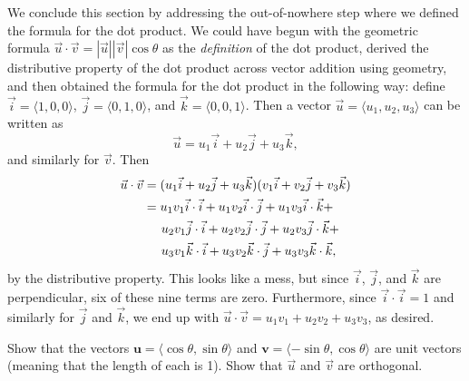 \documentclass{watsonbook}
\begin{document}
We conclude this section by addressing the out-of-nowhere step where
we defined the formula for the dot product. We could have begun with
the geometric formula
$\vec{u} \cdot \vec{v} = |\vec{u}| |\vec{v}| \cos\theta$ as the
\textit{definition} of the dot product, derived the distributive
property of the dot product across vector addition using geometry, and
then obtained the formula for the dot product in the following 
way: define $\vec{i} = \langle1,0,0\rangle$,
$\vec{j} = \langle0,1,0\rangle$, and $\vec{k} =
\langle0,0,1\rangle$. Then a vector
$\vec{u} = \langle u_1, u_2, u_3\rangle$ can be written as
\[
  \vec{u} = u_1 \vec{i} + u_2 \vec{j} + u_3 \vec{k},
\]
and similarly for $\vec{v}$. Then 
\begin{align*}
  \vec{u} \cdot \vec{v} &= (u_1 \vec{i} + u_2 \vec{j} + u_3
                          \vec{k})(v_1 \vec{i} + v_2 \vec{j} + v_3 \vec{k})  \\
                        &= u_1 v_1 \vec{i} \cdot \vec{i} + u_1 v_2 \vec{i} \cdot
                          \vec{j}  + u_1 v_3 \vec{i} \cdot \vec{k}  + \\ 
                        &\hspace{5mm}  u_2 v_1 \vec{j} \cdot \vec{i} + u_2 v_2 \vec{j} \cdot
                          \vec{j}  + u_2 v_3 \vec{j} \cdot \vec{k}  + \\ 
                        &\hspace{5mm}  u_3 v_1 \vec{k} \cdot \vec{i} + u_3 v_2 \vec{k} \cdot
                          \vec{j}  + u_3 v_3 \vec{k} \cdot \vec{k},
\end{align*}
by the distributive property. This looks like a mess, but since
$\vec{i}$,  $\vec{j}$, and  $\vec{k}$ are 
perpendicular, six of these nine terms are zero. Furthermore, since
$\vec{i}\cdot \vec{i} = 1$ and similarly for $\vec{j}$ and
$\vec{k}$, we end up with $  \vec{u} \cdot \vec{v}  = u_1 v_1
+ u_2 v_2 + u_3 v_3$, as desired.

\begin{exercise}{}{}
  Show that the vectors
  $\mathbf{u} = \langle \cos \theta, \sin \theta \rangle$ and
  $\mathbf{v} = \langle -\sin \theta, \cos \theta \rangle$ are unit
  vectors (meaning that the length of each is 1). Show that $\vec{u}$
  and $\vec{v}$ are orthogonal.
\end{exercise}
\end{document}
